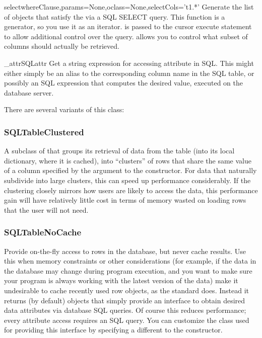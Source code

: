 \documentclass{howto}
\begin{document}
\begin{funcdesc}{select}{whereClause,params=None,oclass=None,selectCols='t1.*'}
  Generate the list of objects that satisfy the 
  via a SQL SELECT query.  This function is a generator, so you
  use it as an iterator.   is passed to the
  cursor execute statement to allow additional control over
  the query.   allows you to control what subset of
  columns should actually be retrieved.
\end{funcdesc}

\begin{funcdesc}{_attrSQL}{attr}
  Get a string expression for accessing attribute  in SQL.
  This might either simply be an alias to the corresponding column
  name in the SQL table, or possibly an SQL expression that computes
  the desired value, executed on the database server.
\end{funcdesc}



There are several variants of this class:
\subsubsection{SQLTableClustered}
A subclass of  that groups its retrieval
of data from the table (into its local dictionary, where it
is cached), into ``clusters'' of rows that share the same value of
a column specified by the  argument to the 
constructor.  For data that naturally subdivide into large clusters,
this can speed up performance considerably.  If the clustering
closely mirrors how users are likely to access the data, this
performance gain will have relatively little cost in terms
of memory wasted on loading rows that the user will not need.


\subsubsection{SQLTableNoCache}
Provide on-the-fly access to rows in the database, 
but never cache results.  Use this when memory constraints or other 
considerations (for example, if the data in the database may change
during program execution, and you want to make sure your program
is always working with the latest version of the data) 
make it undesirable to cache recently used row objects, as the
standard  does.  Instead it returns (by default)
 objects that simply provide an interface
to obtain desired data attributes via database SQL queries.
Of course this reduces performance; every attribute access
requires an SQL query.  You can customize the class used for
providing this interface by specifying a different 
to the constructor.
\end{document}
